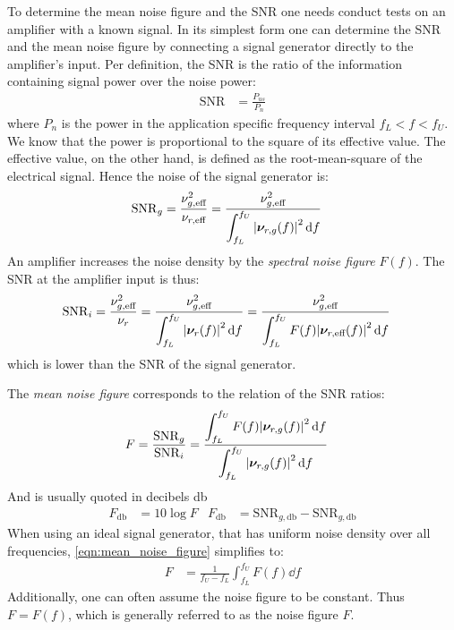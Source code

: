 To determine the mean noise figure and the \acf{SNR} one needs conduct tests on an amplifier with a known signal. In its simplest form one can determine the \ac{SNR} and the mean noise figure by connecting a signal generator directly to the amplifier's input. Per definition, the \ac{SNR} is the ratio of the information containing signal power over the noise power:
\begin{align}
  \mathrm{SNR} &= \frac{P_{us}}{P_n}
\end{align}
where $P_n$ is the power in the application specific frequency interval $f_L<f<f_U$. We know that the power is proportional to the square of its effective value. The effective value, on the other hand, is defined as the root-mean-square of the electrical signal. Hence the noise of the signal generator is:
\begin{align}
  \mathrm{SNR}_g &= \frac{\nu_{g,\text{eff}}^2}{\nu_{r,\text{eff}}} = \frac{\nu_{g,\text{eff}}^2}{\displaystyle\int_{f_L}^{f_U} \abs{\bm{\nu}_{r,g}(f)}^2 \dd{f}} \label{eqn:snr_g}
\end{align}
An amplifier increases the noise density by the \emph{spectral noise figure} $F(f)$. The \ac{SNR} at the amplifier input is thus:
\begin{align}
  \mathrm{SNR}_i &= \frac{\nu_{g,\text{eff}}^2}{\nu_r} = \frac{\nu_{g,\text{eff}}^2}{\displaystyle\int_{f_L}^{f_U} \abs{\bm{\nu}_r(f)}^2 \dd{f}} = \frac{\nu_{g,\text{eff}}^2}{\displaystyle\int_{f_L}^{f_U} F(f)\abs{\bm{\nu}_{r,\text{eff}}(f)}^2 \dd{f}} \label{eqn:snr_i}
\end{align}
which is lower than the \ac{SNR} of the signal generator.

The \emph{mean noise figure} corresponds to the relation of the \ac{SNR} ratios:
\begin{align}
  F &= \frac{\mathrm{SNR}_g}{\mathrm{SNR}_i} = \frac{\displaystyle \int_{f_L}^{f_U} F(f)\abs{\bm{\nu}_{r,g}(f)}^2 \dd{f}}{\displaystyle \int_{f_L}^{f_U} \abs{\bm{\nu}_{r,g}(f)}^2 \dd{f}} \label{eqn:mean_noise_figure}
\end{align}
And is usually quoted in decibels \si{\decibel}
\begin{align}
  F_{\si{\decibel}} &= 10\log F &F_{\si{\decibel}} &= \mathrm{SNR}_{g,\si{\decibel}} - \mathrm{SNR}_{g,\si{\decibel}}
\end{align}
When using an ideal signal generator, that has uniform noise density over all frequencies, \eqref{eqn:mean_noise_figure} simplifies to:
\begin{align}
  F &= \frac{1}{f_U-f_L}\int_{f_L}^{f_U} F(f)\dd{f}
\end{align}
Additionally, one can often assume the noise figure to be constant. Thus $F=F(f)$, which is generally referred to as the noise figure $F$.

